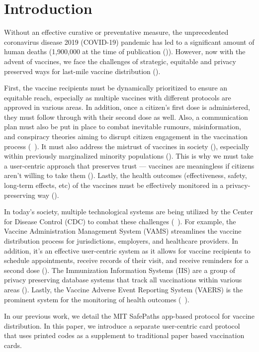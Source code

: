 \section{Introduction}
Without an effective curative or preventative measure, the unprecedented coronavirus disease 2019 (COVID-19) pandemic has led to a significant amount of human deaths (1,900,000 at the time of publication (\cite{webtrack})). However, now with the advent of vaccines, we face the challenges of strategic, equitable and privacy preserved ways for last-mile vaccine distribution (\cite{bae2020challenges, vaccinetrack}).   

First, the vaccine recipients must be dynamically prioritized to ensure an equitable reach, especially as multiple vaccines with different protocols are approved in various areas. In addition, once a citizen’s first dose is administered, they must follow through with their second dose as well. Also, a communication plan must also be put in place to combat inevitable rumours, misinformation, and conspiracy theories aiming to disrupt citizen engagement in the vaccination process (~\cite{morales2021covid19, wp_article}). It must also address the mistrust of vaccines in society (\cite{Palamenghi2020}), especially within previously marginalized minority populations (\cite{JHU}). This is why we must take a user-centric approach that preserves trust — vaccines are meaningless if citizens aren’t willing to take them (\cite{PMC}). Lastly, the health outcomes (effectiveness, safety, long-term effects, etc) of the vaccines must be effectively monitored in a privacy-preserving way (\cite{hbr}).

In today’s society, multiple technological systems are being utilized by the Center for Disease Control (CDC) to combat these challenges (~\cite{cdc1,cdc2,cdc3}). For example, the Vaccine Administration Management System (VAMS) streamlines the vaccine distribution process for jurisdictions, employers, and healthcare providers. In addition, it’s an effective user-centric system as it allows for vaccine recipients to schedule appointments, receive records of their visit, and receive reminders for a second dose (\cite{VAMS}). The Immunization Information Systems (IIS) are a group of privacy preserving database systems that track all vaccinations within various areas (\cite{IIS}). Lastly, the Vaccine Adverse Event Reporting System (VAERS) is the prominent system for the monitoring of health outcomes (~\cite{VAERS,vaers_article}).

In our previous work, we detail the MIT SafePaths app-based protocol for vaccine distribution. In this paper, we introduce a separate user-centric card protocol that uses printed codes as a supplement to traditional paper based vaccination cards. 